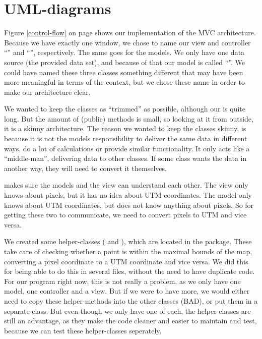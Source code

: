 \chapter{UML-diagrams}
\label{UML}

Figure \ref{control-flow} on page \pageref{control-flow} shows our
implementation of the MVC architecture. Because we have exactly one window, we chose to name our view and controller ``'' and 
``'', respectively. The same goes for the models. We only have one data 
source (the provided data set), and because of that our model is called
``''. We could have named these three classes something different that may have been more meaningful 
in terms of the  context, but we chose these name in order to make 
our architecture clear.

We wanted to keep the classes as ``trimmed'' as possible, although our
 is quite long. But the amount of (public) methods is small, so
looking at it from outside, it is a skinny architecture. The reason we wanted to
keep the classes skinny, is because it is not the models responsibility to
deliver the same data in different ways, do a lot of calculations or provide
similar functionality. It only acts like a ``middle-man'', delivering data to
other classes. If some class wants the data in another way, they will need to convert it themselves.

 makes sure the models and the view can understand each other. The view 
only knows about pixels, but it has no idea about UTM coordinates. The model only knows 
about UTM coordinates, but does not know anything about pixels. So for getting
these two to communicate, we need to convert pixels to UTM and vice versa.

We created some helper-classes ( and ), 
which are located in the  package. These take care of checking whether a point 
is within the maximal bounds of the map, converting a pixel coordinate to a UTM coordinate 
and vice versa. We did this for being able to do this in several files, without the need to have 
duplicate code. For our program right now, this is not really a problem, as we
only have one model, one controller and a view. But if we were to have more, we would either need to copy 
these helper-methods into the other classes (BAD), or put them in a separate class. But even 
though we only have one of each, the helper-classes are still an advantage, as
they make the code cleaner and easier to maintain and test, because we can test
these helper-classes seperately.

